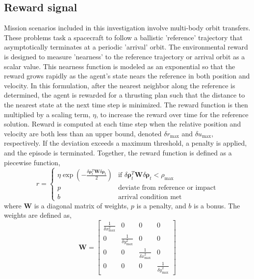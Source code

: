 \documentclass[conference]{IEEEtran}
\begin{document}
\subsection{Reward signal}
Mission scenarios included in this investigation involve multi-body orbit transfers. These problems task a spacecraft to follow a ballistic 'reference' trajectory that asymptotically terminates at a periodic 'arrival' orbit. The environmental reward is designed to measure 'nearness' to the reference trajectory or arrival orbit as a scalar value. This nearness function is modeled as an exponential so that the reward grows rapidly as the agent's state nears the reference in both position and velocity. In this formulation, after the nearest neighbor along the reference is determined, the agent is rewarded for a thrusting plan such that the distance to the nearest state at the next time step is minimized. The reward function is then multiplied by a scaling term, \(\eta\), to increase the reward over time for the reference solution. Reward is computed at each time step when the relative position and velocity are both less than an upper bound, denoted \(\delta r_{\max}\) and \(\delta u_{\max}\), respectively. If the deviation exceeds a maximum threshold, a penalty is applied, and the episode is terminated. Together, the reward function is defined as a piecewise function,
\begin{equation}
    r = \begin{cases}
        \eta \exp\left( -\frac{\delta \boldsymbol{\rho}_t^T \boldsymbol{W} \delta \boldsymbol{\rho}_t}{2} \right) & \text{if } \delta \boldsymbol{\rho}_t^T \boldsymbol{W} \delta \boldsymbol{\rho}_t < \rho_{\max} \\
        p & \text{deviate from reference or impact} \\
        b & \text{arrival condition met}
    \end{cases}
\end{equation}
where \(\boldsymbol{W}\) is a diagonal matrix of weights, \(p\) is a penalty, and \(b\) is a bonus. The weights are defined as,
\begin{equation}
    \boldsymbol{W} = \begin{bmatrix}
        \frac{1}{\delta x_{\max}^2} & 0 & 0 & 0 \\
        0 & \frac{1}{\delta y_{\max}^2} & 0 & 0 \\
        0 & 0 & \frac{1}{\delta \dot{x}_{\max}^2} & 0 \\
        0 & 0 & 0 & \frac{1}{\delta \dot{y}_{\max}^2}
    \end{bmatrix}
\end{equation}
\end{document}
